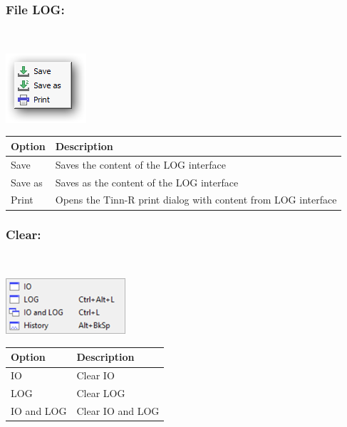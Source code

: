 \hypertarget{menu_r_term_file_Log}{}
\subsubsection{File LOG:}\\

\includegraphics[scale=0.50]{./res/menu_r_term_file_IOandLog.png}\\

\begin{scriptsize}
  \begin{tabularx}{\textwidth}{>{\hsize=0.3\hsize}X>{\hsize=0.7\hsize}X}\\
    \hline
    \textbf{Option} & \textbf{Description} \\
    \hline
    Save & Saves the content of the LOG interface \\
    Save as & Saves as the content of the LOG interface \\
    Print & Opens the Tinn-R print dialog with content from LOG interface \\
    \hline
  \end{tabularx}
\end{scriptsize}

\hypertarget{menu_r_term_clear}{}
\subsubsection{Clear:}\\

\includegraphics[scale=0.50]{./res/menu_r_term_clear.png}\\

\begin{scriptsize}
  \begin{tabularx}{\textwidth}{>{\hsize=0.3\hsize}X>{\hsize=0.7\hsize}X}\\
    \hline
    \textbf{Option} & \textbf{Description} \\
    \hline
    IO & Clear IO \\
    LOG & Clear LOG \\
    IO and LOG & Clear IO and LOG \\
    \hline
  \end{tabularx}
\end{scriptsize}

